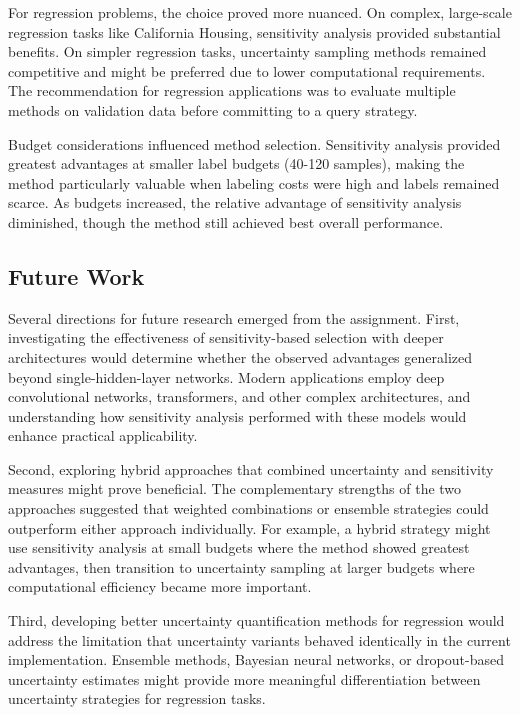 \documentclass[conference]{IEEEtran}
\begin{document}
For regression problems, the choice proved more nuanced. On complex, large-scale regression tasks like California Housing, sensitivity analysis provided substantial benefits. On simpler regression tasks, uncertainty sampling methods remained competitive and might be preferred due to lower computational requirements. The recommendation for regression applications was to evaluate multiple methods on validation data before committing to a query strategy.

Budget considerations influenced method selection. Sensitivity analysis provided greatest advantages at smaller label budgets (40-120 samples), making the method particularly valuable when labeling costs were high and labels remained scarce. As budgets increased, the relative advantage of sensitivity analysis diminished, though the method still achieved best overall performance.

\subsection{Future Work}

Several directions for future research emerged from the assignment. First, investigating the effectiveness of sensitivity-based selection with deeper architectures would determine whether the observed advantages generalized beyond single-hidden-layer networks. Modern applications employ deep convolutional networks, transformers, and other complex architectures, and understanding how sensitivity analysis performed with these models would enhance practical applicability.

Second, exploring hybrid approaches that combined uncertainty and sensitivity measures might prove beneficial. The complementary strengths of the two approaches suggested that weighted combinations or ensemble strategies could outperform either approach individually. For example, a hybrid strategy might use sensitivity analysis at small budgets where the method showed greatest advantages, then transition to uncertainty sampling at larger budgets where computational efficiency became more important.

Third, developing better uncertainty quantification methods for regression would address the limitation that uncertainty variants behaved identically in the current implementation. Ensemble methods, Bayesian neural networks, or dropout-based uncertainty estimates might provide more meaningful differentiation between uncertainty strategies for regression tasks.
\end{document}
